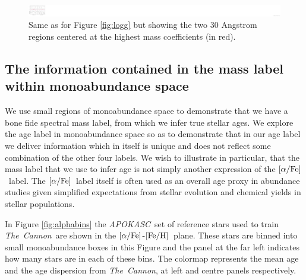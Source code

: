 \documentclass[12pt, preprint]{aastex}
\newcommand{\project}[1]{\textsl{#1}}
\newcommand{\tc}{\project{The~Cannon}}
\newcommand{\apokasc}{\project{APOKASC}}
\newcommand{\feh}{\mbox{$\rm [Fe/H]$}}
\newcommand{\alphafe}{\mbox{$\rm [\alpha/Fe]$}}
\begin{document}
\begin{figure}[h!]
\centering
    \includegraphics[scale=0.51]{./plots/coeffs_m_3.png}
  \caption{Same as for Figure \ref{fig:logg} but showing the two 30 Angstrom regions centered at the highest mass coefficients (in red).}
\label{fig:mass}
\end{figure}



\subsection{The information contained in the mass label within monoabundance space}

We use small regions of monoabundance space to demonstrate that we have a bone fide spectral mass label, from which we infer true stellar ages. We explore the age label in monoabundance space so as to demonstrate that in our age label we deliver information which in itself is unique and does not reflect some combination of the other four labels. We wish to illustrate in particular, that the mass label that we use to infer age is not simply another expression of the \alphafe\ label. The \alphafe\ label itself is often used as an overall age proxy in abundance studies given simplified expectations from stellar evolution and chemical yields in stellar populations. 

In Figure \ref{fig:alphabins} the \apokasc\ set of reference stars used to train \tc\ are shown in the \alphafe-\feh\ plane. These stars are binned into small monoabundance boxes in this Figure and the panel at the far left indicates how many stars are in each of these bins. The colormap represents the mean age and the age dispersion from \tc, at left and centre panels respectively. 
\end{document}
